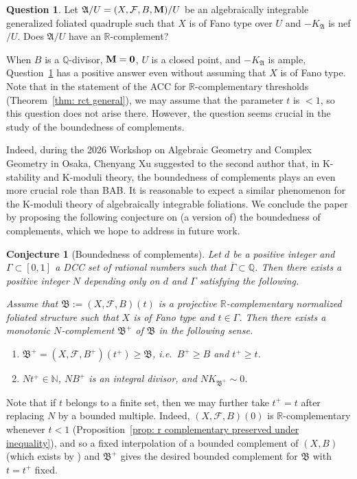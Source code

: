 \documentclass[11pt,reqno]{amsart}
\numberwithin{equation}{section}
\newcommand{\Mm}{{\bf{M}}}
\newcommand{\Aa}{{\mathfrak{A}}}
\newcommand{\Bb}{{\mathfrak{B}}}
\newcommand{\Ff}{\mathcal{F}}
\newcommand{\Ii}{\Gamma}
\newtheorem{conj}[thm]{Conjecture}
\theoremstyle{definition}
\newtheorem{ques}[thm]{Question}
\begin{document}
\begin{ques}\label{ques: rcomplement when t=1 fano}
    Let $\Aa/U=(X,\Ff,B,\Mm)/U$ be an algebraically integrable generalized foliated quadruple such that $X$ is of Fano type over $U$ and $-K_{\Aa}$ is nef$/U$. Does $\Aa/U$ have an $\mathbb R$-complement?
\end{ques}
When $B$ is a $\mathbb Q$-divisor, $\Mm=\bm{0}$, $U$ is a closed point, and $-K_{\Aa}$ is ample, Question~\ref{ques: rcomplement when t=1 fano} has a positive answer \cite[Theorem~1.1]{CJV24} even without assuming that $X$ is of Fano type. Note that in the statement of the ACC for $\mathbb R$-complementary thresholds (Theorem~\ref{thm: rct general}), we may assume that the parameter $t$ is $<1$, so this question does not arise there. However, the question seems crucial in the study of the boundedness of complements. 

Indeed, during the 2026 Workshop on Algebraic Geometry and Complex Geometry in Osaka, Chenyang Xu suggested to the second author that, in K-stability and K-moduli theory, the boundedness of complements plays an even more crucial role than BAB. It is reasonable to expect a similar phenomenon for the K-moduli theory of algebraically integrable foliations. We conclude the paper by proposing the following conjecture on (a version of) the boundedness of complements, which we hope to address in future work.

\begin{conj}[Boundedness of complements]\label{conj: boundedness of complements}
Let $d$ be a positive integer and $\Ii\subset [0,1]$ a DCC set of rational numbers such that $\overline{\Ii}\subset\mathbb Q$. Then there exists a positive integer $N$ depending only on $d$ and $\Ii$ satisfying the following. 

Assume that $\Bb:=(X,\Ff,B)(t)$ is a projective $\mathbb R$-complementary normalized foliated structure such that $X$ is of Fano type and $t\in\Ii$. Then there exists a monotonic $N$-complement $\Bb^+$ of $\Bb$ in the following sense.
\begin{enumerate}
    \item $\Bb^+=(X,\Ff,B^+)(t^+)\geq\Bb$, i.e.\ $B^+\geq B$ and $t^+\geq t$.
    \item $Nt^+\in\mathbb N$, $NB^+$ is an integral divisor, and $NK_{\Bb^+}\sim 0$.
\end{enumerate}
\end{conj}
Note that if $t$ belongs to a finite set, then we may further take $t^+=t$ after replacing $N$ by a bounded multiple. Indeed, $(X,\Ff,B)(0)$ is $\mathbb R$-complementary whenever $t<1$ (Proposition~\ref{prop: r complementary preserved under inequality}), and so a fixed interpolation of a bounded complement of $(X,B)$ (which exists by \cite[Theorem~1.7]{Bir19}) and $\Bb^+$ gives the desired bounded complement for $\Bb$ with $t=t^+$ fixed.
\end{document}
